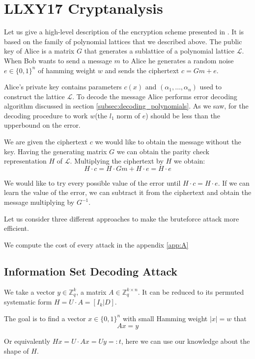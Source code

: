 \documentclass[12pt]{article}
\newcommand{\ZZ}{\mathbb{Z}}
\newcommand{\LL}{\mathcal{L}}
\begin{document}
\section{LLXY17 Cryptanalysis}
\label{sec:cryptanalysis}

Let us give a high-level description of the encryption scheme presented in \cite{[LLXY17]}. It is based on the family of polynomial lattices that we described above. The public key of Alice is a matrix $G$ that generates a sublattice of a polynomial lattice $\LL$. When Bob wants to send a message $m$ to Alice he generates a random noise $ e \in \{0,1\}^{n}$ of hamming weight $w$ and sends the ciphertext $c = Gm + e$.

Alice's private key contains parameters $c(x)$ and $(\alpha_1, \dots, \alpha_n)$ used to construct the lattice $\LL$. To decode the message Alice performs error decoding algorithm discussed in section \ref{subsec:decoding_polynomials}. As we saw, for the decoding procedure to work $w$(the $l_1$ norm of $e$) should be less than the upperbound on the error.

We are given the ciphertext $c$ we would like to obtain the message without the key. Having the generating matrix $G$ we can obtain the parity check representation $H$ of $\LL$. Multiplying the ciphertext by $H$ we obtain:
\[
    H \cdot c = H \cdot Gm + H \cdot e = H \cdot e
\]

We would like to try every possible value of the error until $H \cdot c = H \cdot e$. If we can learn the value of the error, we can subtract it from the ciphertext and obtain the message multiplying by $G^{-1}$.

Let us consider three different approaches to make the bruteforce attack more efficient.

We compute the cost of every attack in the appendix \ref{app:A}


\subsection{Information Set Decoding Attack}

We take a vector $y \in \ZZ_q^{k}$, a matrix $A \in \ZZ_q^{k \times n}$. It can be reduced to its permuted systematic form $H  = U \cdot A = [I_{k}|D]$.


The goal is to find a vector $x \in \{0,1\}^{n}$ with small Hamming weight $|x| = w$ that
\[
Ax = y
\]

Or equivalently $Hx = U\cdot Ax = Uy =: t$, here we can use our knowledge about the shape of $H$.
\end{document}
